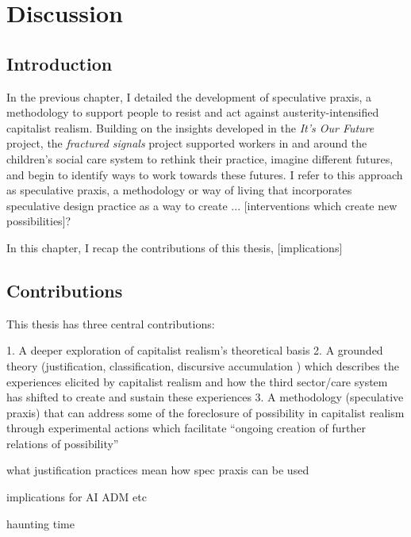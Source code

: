 \chapter{Discussion}
\label{}

\section{Introduction}
\label{sec:}
In the previous chapter, I detailed the development of speculative praxis, a methodology to support people to resist and act against austerity-intensified capitalist realism. Building on the insights developed in the \emph{It's Our Future} project, the \emph{fractured signals} project supported workers in and around the children's social care system to rethink their practice, imagine different futures, and begin to identify ways to work towards these futures. I refer to this approach as speculative praxis, a methodology or way of living that incorporates speculative design practice as a way to create ... [interventions which create new possibilities]?

In this chapter, I recap the contributions of this thesis, [implications]





\section{Contributions}
This thesis has three central contributions:  

1. A deeper exploration of capitalist realism’s theoretical basis
2. A grounded theory (justification, classification, discursive accumulation ) which describes the experiences elicited by capitalist realism and how the third sector/care system has shifted to create and sustain these experiences
3. A methodology (speculative praxis) that can address some of the foreclosure of possibility in capitalist realism through experimental actions which facilitate “ongoing creation of further relations of possibility”

what justification practices mean 
how spec praxis can be used

implications for AI ADM etc

haunting 
time


